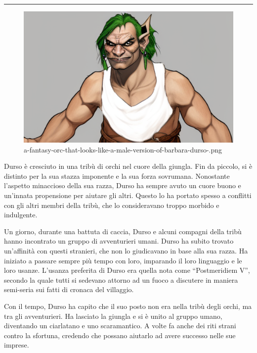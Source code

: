 \begin{center}\rule{0.5\linewidth}{0.5pt}\end{center}

\begin{figure}
\centering
\includegraphics{a-fantasy-orc-that-looks-like-a-male-version-of-barbara-durso-.png}
\caption{a-fantasy-orc-that-looks-like-a-male-version-of-barbara-durso-.png}
\end{figure}

Durso è cresciuto in una tribù di orchi nel cuore della giungla. Fin da
piccolo, si è distinto per la sua stazza imponente e la sua forza
sovrumana. Nonostante l'aspetto minaccioso della sua razza, Durso ha
sempre avuto un cuore buono e un'innata propensione per aiutare gli
altri. Questo lo ha portato spesso a conflitti con gli altri membri
della tribù, che lo consideravano troppo morbido e indulgente.

Un giorno, durante una battuta di caccia, Durso e alcuni compagni della
tribù hanno incontrato un gruppo di avventurieri umani. Durso ha subito
trovato un'affinità con questi stranieri, che non lo giudicavano in base
alla sua razza. Ha iniziato a passare sempre più tempo con loro,
imparando il loro linguaggio e le loro usanze. L'usanza preferita di
Durso era quella nota come ``Postmeridiem V'', secondo la quale tutti si
sedevano attorno ad un fuoco a discutere in maniera semi-seria sui fatti
di cronaca del villaggio.

Con il tempo, Durso ha capito che il suo posto non era nella tribù degli
orchi, ma tra gli avventurieri. Ha lasciato la giungla e si è unito al
gruppo umano, diventando un ciarlatano e uno scaramantico. A volte fa
anche dei riti strani contro la sfortuna, credendo che possano aiutarlo
ad avere successo nelle sue imprese.

